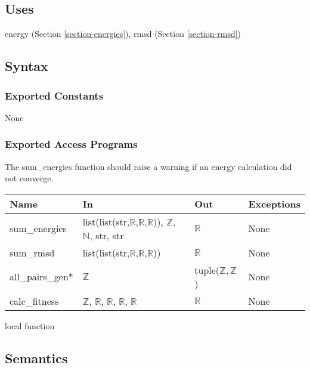 \documentclass[12pt, titlepage]{article}
\begin{document}
\subsection{Uses}

energy (Section \ref{section-energies}), rmsd (Section \ref{section-rmsd})

\subsection{Syntax}

\subsubsection{Exported Constants}

None

\subsubsection{Exported Access Programs}

The sum\_energies function should raise a warning if an energy calculation did 
not converge.

\begin{center}
	\begin{tabular}{p{2cm} p{4cm} p{4cm} p{2cm}}
		\hline
		\textbf{Name} & \textbf{In} & \textbf{Out} & \textbf{Exceptions} \\
		\hline
		sum\_energies &  
		list(list(str,$\mathbb{R}$,$\mathbb{R}$,$\mathbb{R}$)), $\mathbb{Z}$, 
		$\mathbb{N}$, str, str & $\mathbb{R}$ 
		& None \\
		sum\_rmsd &  list(list(str,$\mathbb{R}$,$\mathbb{R}$,$\mathbb{R}$)) & 
		$\mathbb{R}$ & None \\
		all\_pairs\_gen* & $\mathbb{Z}$ & tuple($\mathbb{Z}, \mathbb{Z}$) & 
		None 
		\\
		calc\_fitness & $\mathbb{Z}$, $\mathbb{R}$, $\mathbb{R}$, $\mathbb{R}$, 
		$\mathbb{R}$ & $\mathbb{R}$ & None \\
		\hline
	\end{tabular}
\end{center}

\noindent * local function 

\subsection{Semantics}
\end{document}
